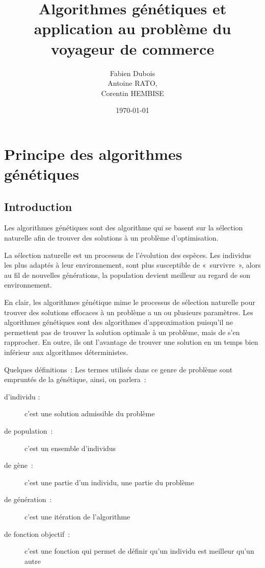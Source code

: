 \documentclass{article}
\begin{document}
\title{Algorithmes génétiques et application au problème du voyageur de commerce}
\author{Fabien Dubois\\
   Antoine RATO,\\
   Corentin HEMBISE	\\}
\date{\today}

\maketitle

\tableofcontents

\section{Principe des algorithmes génétiques}
	\subsection{Introduction}
	Les algorithmes génétiques sont des algorithme qui se basent sur la sélection naturelle afin de trouver des solutions à un problème d'optimisation. 

	La sélection naturelle est un processus de l'évolution des espèces. Les individus les plus adaptés à leur environnement, sont plus susceptible de « survivre », alors au fil de nouvelles générations, la population devient meilleur au regard de son environnement.

	En clair, les algorithmes génétique mime le processus de sélection naturelle pour trouver des solutions effocaces à un problème a un ou plusieurs paramètres.
	Les algorithmes génétiques sont des algorithmes d'approximation puisqu'il ne permettent pas de trouver la solution optimale à un problème, mais de s'en rapprocher. En outre, ils ont l'avantage de trouver une solution en un temps bien inférieur aux algorithmes déterministes.

	Quelques définitions :
	Les termes utilisés dans ce genre de problème sont empruntés de la génétique, ainsi, on parlera :
	\begin{description}
	\item [d'individu :] c'est une solution admissible du problème
	\item [de population :] c'est un ensemble d'individus
	\item [de gène :] c'est une partie d'un individu, une partie du problème
	\item [de génération :] c'est une itération de l'algorithme
	\item [de fonction objectif :] c'est une fonction qui permet de définir qu'un individu est meilleur qu'un autre
	\end{description}
\end{document}
